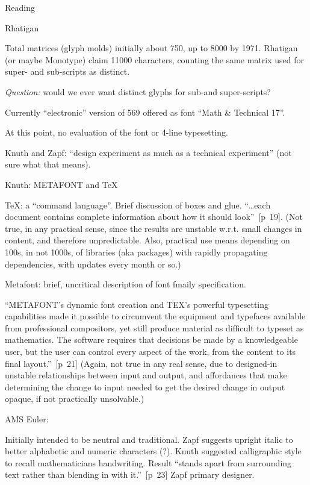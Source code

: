\documentclass[11pt]{PalisadesLakesBook}
\begin{document}
\begin{plSection}{Reading}
\begin{plSection}{Rhatigan}
\begin{plSection}{}
\begin{plSection}{}
Total matrices (glyph molds) initially about 750, 
up to 8000 by 1971. 
Rhatigan (or maybe Monotype) claim 11000 characters,
counting the same matrix used for super- and sub-scripts
as distinct.

\emph{Question:} would we ever want distinct glyphs 
for sub-and super-scripts?

Currently ``electronic'' version of 569 offered as font
``Math \& Technical 17''.

At this point, no evaluation of the font or 4-line typesetting.

\end{plSection}%
\begin{plSection}{}

Knuth and Zapf: 
``design experiment as much as a technical experiment''
(not sure what that means).

Knuth: METAFONT and {\TeX}

TeX: a ``command language''. Brief discussion of boxes and glue.
``{\ldots}each document contains complete information 
about how it should look''~[p~19]. 
(Not true, in any practical sense,
since the results are unstable w.r.t. small changes in content,
and therefore unpredictable. Also, practical use means depending
on 100s, in not 1000s, of libraries (aka packages) 
with rapidly propagating dependencies, 
with updates every month or so.)

Metafont: brief, uncritical description of font fmaily specification.

``METAFONT’s dynamic font creation and 
TEX’s powerful typesetting capabilities 
made it possible to circumvent the equipment and typefaces 
available from professional compositors,
yet still produce material as difficult to typeset as mathematics. 
The software requires that decisions be made 
by a knowledgeable user, 
but the user can control every aspect of the work, 
from the content to its final layout.''~[p~21]
(Again, not true in any real sense, due to designed-in unstable
relationships between input and output, and 
affordances that make determining the change to input needed
to get the desired change in output opaque,
if not practically unsolvable.)

AMS Euler: 

Initially intended to be neutral and traditional.
Zapf suggests upright italic to better alphabetic and numeric
characters (?).
Knuth suggested calligraphic style to recall mathematicians
handwriting.
Result ``stands apart from surrounding text 
rather than blending in with it.''~[p~23]
Zapf primary designer.


\end{plSection}
\end{plSection}
\end{plSection}
\end{plSection}
\end{document}
